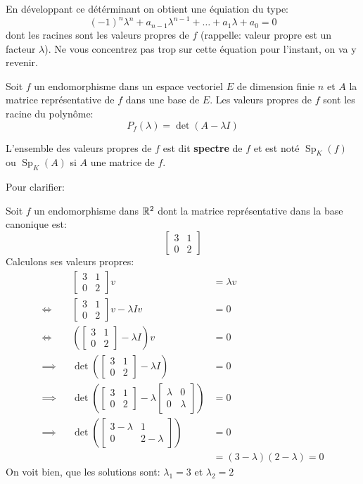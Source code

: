 En développant ce détérminant on obtient une équiation du type:
\[
    (-1)^n\lambda^n + a_{n-1}\lambda^{n-1} + \ldots + a_1\lambda + a_0 = 0
\] 
dont les racines sont les valeurs propres de $f$ (rappelle: valeur propre est un facteur $\lambda$).
Ne vous concentrez pas trop sur cette équation pour l'instant, on va y revenir.
\begin{prop}
   Soit $f$ un endomorphisme dans un espace vectoriel  $E$ de dimension finie  $n$ et $A$ la matrice représentative de  $f$ dans une base de  $E$. Les valeurs propres de  $f$ sont les racine du polynôme:
   \[
   P_f(\lambda) = \det(A - \lambda I)
   \] 
\end{prop}
\begin{definition}
    L'ensemble des valeurs propres de $f$ est dit  \textbf{spectre} de $f$ et est noté  $\operatorname{Sp}_K(f)$ ou  $\operatorname{Sp}_K(A)$ si $A$ une matrice de  $f$.
\end{definition}
Pour clarifier:
\begin{eg}
   Soit $f$ un endomorphisme dans  $\mathbb{R}^2$ dont la matrice représentative dans la base canonique est:
   \[
       \begin{bmatrix} 3 & 1\\ 0 & 2 \end{bmatrix} 
   \] 
   Calculons ses valeurs propres:
   \begin{align*}
       && \begin{bmatrix} 3 & 1\\ 0 & 2 \end{bmatrix} v &= \lambda v \\
       \iff && \begin{bmatrix} 3 & 1\\ 0 & 2 \end{bmatrix} v - \lambda I v &= 0\\
       \iff && \left(\begin{bmatrix} 3 & 1\\ 0 & 2 \end{bmatrix}  - \lambda I\right)v  &= 0\\
       \implies && \det \left( \begin{bmatrix} 3 & 1\\ 0 & 2 \end{bmatrix}  - \lambda I \right) &= 0\\
       \implies && \det \left( \begin{bmatrix} 3 & 1\\ 0 & 2 \end{bmatrix}  - \lambda \begin{bmatrix} \lambda & 0\\ 0 & \lambda \end{bmatrix}  \right) &= 0\\
       \implies && \det \left( \begin{bmatrix} 3 - \lambda & 1\\ 0 & 2 - \lambda \end{bmatrix}\right) &= 0\\
                && &= (3-\lambda)(2 - \lambda) = 0
   \end{align*}
   On voit bien, que les solutions sont: $\lambda_1 = 3$ et  $\lambda_2 = 2$
\end{eg}
